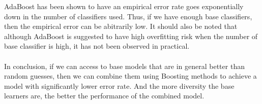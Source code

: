 \documentclass[12pt,a4paper]{article}
\begin{document}
AdaBoost has been shown to have an empirical error rate goes exponentially down in the number of classifiers used. Thus, if we have enough base classifiers, then the empirical error can be abitrarily low. It should also be noted that although AdaBoost is suggested to have high overfitting risk when the number of base classifier is high, it has not been observed in practical.\\\\
In conclusion, if we can access to base models that are in general better than random guesses, then we can combine them using Boosting methods to achieve a model with significantly lower error rate. And the more diversity the base learners are, the better the performance of the combined model.
\end{document}
